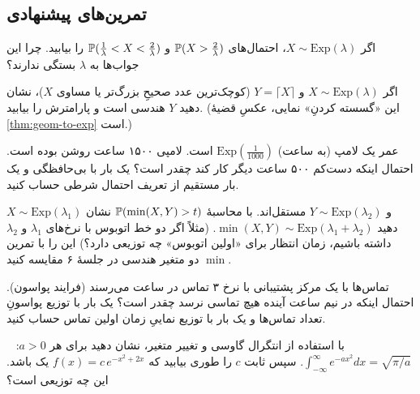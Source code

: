 \subsection*{تمرین‌های پیشنهادی}

\begin{exercise}
اگر $X\sim\mathrm{Exp}(\lambda)$، احتمال‌های $\P(X>\frac2\lambda)$ و $\P(\frac1\lambda<X<\frac2\lambda)$ را بیابید. چرا این جواب‌ها به $\lambda$ بستگی ندارند؟
\end{exercise}

\begin{exercise}
اگر $X\sim\mathrm{Exp}(\lambda)$ و $Y=\lceil X\rceil$ (کوچک‌ترین عدد صحیحِ بزرگ‌تر یا مساوی $X$)، نشان دهید $Y$ هندسی است و پارامترش را بیابید. (این «گسسته کردنِ» نمایی، عکسِ قضیهٔ \ref{thm:geom-to-exp} است.)
\end{exercise}

\begin{exercise}
عمر یک لامپ (به ساعت) $\mathrm{Exp}(\frac1{1000})$ است. لامپی ۱۵۰۰ ساعت روشن بوده است. احتمال اینکه دست‌کم ۵۰۰ ساعت دیگر کار کند چقدر است؟ یک بار با بی‌حافظگی و یک بار مستقیم از تعریف احتمال شرطی حساب کنید.
\end{exercise}

\begin{exercise}
$X\sim\mathrm{Exp}(\lambda_1)$ و $Y\sim\mathrm{Exp}(\lambda_2)$ مستقل‌اند. با محاسبهٔ $\P(\min(X,Y)>t)$ نشان دهید $\min(X,Y)\sim\mathrm{Exp}(\lambda_1+\lambda_2)$. (مثلاً اگر دو خط اتوبوس با نرخ‌های $\lambda_1$ و $\lambda_2$ داشته باشیم، زمان انتظار برای «اولین اتوبوس» چه توزیعی دارد؟) این را با تمرین $\min$ دو متغیر هندسی در جلسهٔ ۶ مقایسه کنید.
\end{exercise}

\begin{exercise}
تماس‌ها با یک مرکز پشتیبانی با نرخ ۳ تماس در ساعت می‌رسند (فرایند پواسون). احتمال اینکه در نیم ساعت آینده هیچ تماسی نرسد چقدر است؟ یک بار با توزیع پواسونِ تعداد تماس‌ها و یک بار با توزیع نماییِ زمان اولین تماس حساب کنید.
\end{exercise}

\begin{exercise}
با استفاده از انتگرال گاوسی و تغییر متغیر، نشان دهید برای هر $a>0$: \ $\int_{-\infty}^{\infty}e^{-ax^2}dx=\sqrt{\pi/a}$. سپس ثابت $c$ را طوری بیابید که $f(x)=c\,e^{-x^2+2x}$ یک  باشد. این چه توزیعی است؟
\end{exercise}

